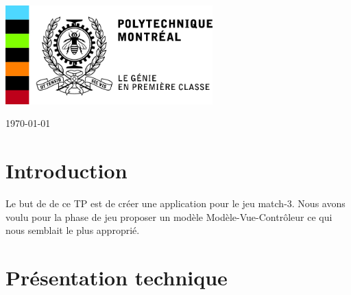 \begin{titlepage}



\includegraphics[height=3.8cm]{poly.jpg} %
 


{\large \today}\\[2cm] %


\vfill %

\end{titlepage}

\section{Introduction}
Le but de de ce TP est de créer une application pour le jeu match-3. Nous avons voulu pour la phase de jeu proposer un modèle Modèle-Vue-Contrôleur ce qui nous semblait le plus approprié.
\section{Présentation technique}
